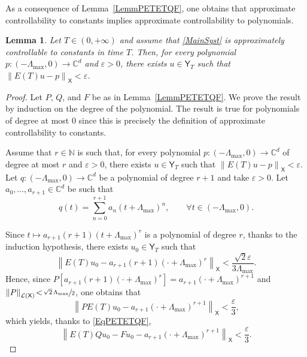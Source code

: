 \documentclass[JEP,XML,SOM,Unicode]{cedram}
\theoremstyle{plain}
\newtheorem{lemm}[theo]{Lemma}
\theoremstyle{definition}
\newcommand{\norm}[1]{\left\lVert #1\right\lVert}
\begin{document}
As a consequence of Lemma~\ref{LemmPETETQF}, one obtains that approximate controllability to constants implies approximate controllability to polynomials.

\begin{lemm}
\label{LemmApproxToPoly}
Let $T \in (0, +\infty)$ and assume that \eqref{MainSyst} is approximately controllable to constants in time $T$. Then, for every polynomial $p: (-\Lambda_{\max}, 0) \to \mathbb C^d$ and $\varepsilon > 0$, there exists $u \in \mathsf Y_T$ such that $\norm{E(T) u - p}_{\mathsf X} < \varepsilon$.
\end{lemm}

\begin{proof}
Let $P$, $Q$, and $F$ be as in Lemma~\ref{LemmPETETQF}. We prove the result by induction on the degree of the polynomial. The result is true for polynomials of degree at most $0$ since this is precisely the definition of approximate controllability to constants.

Assume that $r \in \mathbb N$ is such that, for every polynomial $p: (-\Lambda_{\max}, 0) \to \mathbb C^d$ of degree at most $r$ and $\varepsilon > 0$, there exists $u \in \mathsf Y_T$ such that $\norm{E(T) u - p}_{\mathsf X} < \varepsilon$. Let $q: (-\Lambda_{\max}, 0) \to \mathbb C^d$ be a polynomial of degree $r + 1$ and take $\varepsilon > 0$. Let $a_0, \dots, a_{r+1} \in \mathbb C^d$ be such that
\[q(t) = \sum_{n=0}^{r + 1} a_n (t + \Lambda_{\max})^n, \qquad \forall t \in (-\Lambda_{\max}, 0).\]

Since $t \mapsto a_{r+1} (r+1) (t + \Lambda_{\max})^r$ is a polynomial of degree $r$, thanks to the induction hypothesis, there exists $u_0 \in \mathsf Y_T$ such that
\[
\norm{E(T) u_0 - a_{r+1} (r+1) (\cdot + \Lambda_{\max})^r}_{\mathsf X} < \frac{\sqrt{2}\varepsilon}{3 \Lambda_{\max}}.
\]
Hence, since $P \left[a_{r+1} (r+1) (\cdot + \Lambda_{\max})^r\right] \!=\!a_{r+1} (\cdot + \Lambda_{\max})^{r+1}$ and \hbox{$\norm{P}_{\mathcal L(\mathsf X)}\!<\!\sfrac{\sqrt{2}\, \Lambda_{\max}}{2}$}, one obtains that
\[
\norm{P E(T) u_0 - a_{r+1} (\cdot + \Lambda_{\max})^{r+1}}_{\mathsf X} < \frac{\varepsilon}{3},
\]
which yields, thanks to \eqref{EqPETETQF},
\begin{equation}
\label{EstimU0}
\norm{E(T) Q u_0 - F u_0 - a_{r+1} (\cdot + \Lambda_{\max})^{r+1}}_{\mathsf X} < \frac{\varepsilon}{3}.
\end{equation}


\end{proof}
\end{document}

